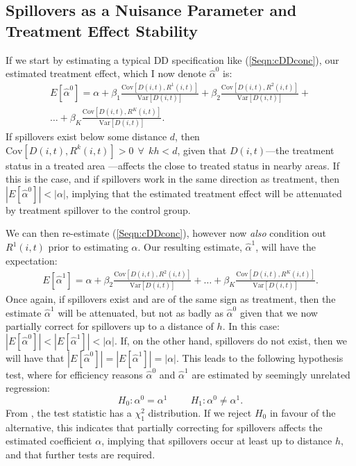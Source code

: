 \documentclass[12pt]{article}
\newcommand{\Var}{\mathrm{Var}}
\newcommand{\Cov}{\mathrm{Cov}}
\newcommand{\Bias}[2]{\frac{\Cov[#1,#2]}{\Var[#1]}}
\begin{document}
\begin{spacing}{1.3}
\section{Spillovers as a Nuisance Parameter and Treatment Effect Stability}
If we start by estimating a typical DD specification like (\ref{Seqn:cDDconc}),
our estimated treatment effect, which I now denote $\hat\alpha^0$ is:
\begin{equation}
\nonumber
\begin{split}
E[\hat\alpha^0]=\alpha + \beta_1\Bias{D(i,t)}{R^1(i,t)}
                                + \beta_2\Bias{D(i,t)}{R^2(i,t)}
                                + \\ \ldots
                                + \beta_K\Bias{D(i,t)}{R^K(i,t)}.
\end{split}
\end{equation}
If spillovers exist below some distance $d$, then $\Cov[D(i,t),R^k(i,t)]>0 \ \ 
\forall \ \ kh<d$, given that $D(i,t)$---the treatment status in a treated area%
---affects the close to treated status in nearby areas. If this is the case, and 
if spillovers work in the same direction as treatment, then 
$|E[\hat\alpha^0]|<|\alpha|$, implying that the estimated treatment 
effect will be attenuated by treatment spillover to the control group.  

We can then re-estimate (\ref{Seqn:cDDconc}), however now \emph{also} condition
out $R^1(i,t)$ prior to estimating $\alpha$.  Our resulting estimate, 
$\hat\alpha^1$, will have the expectation:
\begin{equation}
\nonumber
\begin{split}
E[\hat\alpha^1]=\alpha + \beta_2\Bias{D(i,t)}{R^2(i,t)}
                                + \ldots
                                + \beta_K\Bias{D(i,t)}{R^K(i,t)}.
\end{split}
\end{equation}
Once again, if spillovers exist and are of the same sign as treatment, then the
estimate $\hat\alpha^1$ will be attenuated, but not as badly as $\hat\alpha^0$ 
given that we now partially correct for spillovers up to a distance of $h$.  In 
this case: $|E[\hat\alpha^0]|<|E[\hat\alpha^1]|<|\alpha|$.  If, on the other 
hand, spillovers do not exist, then we will have that 
$|E[\hat\alpha^0]|=|E[\hat\alpha^1]|=|\alpha|$.  This leads to 
the following hypothesis test, where for efficiency reasons $\hat\alpha^0$
and $\hat\alpha^1$ are estimated by seemingly unrelated regression:
\[
H_0: \alpha^0=\alpha^1 \hspace{1cm}
H_1: \alpha^0\neq\alpha^1.
\]
From \citet{Zellner1962}, the test statistic has a $\chi^2_1$ distribution. If 
we reject $H_0$ in favour of the alternative, this indicates that partially 
correcting for spillovers affects the estimated coefficient $\alpha$, implying 
that spillovers occur at least up to distance $h$, and that further tests are 
required.  


\end{spacing}
\end{document}
